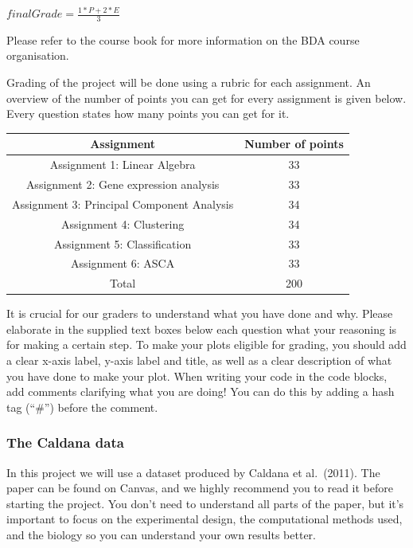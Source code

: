 \documentclass[
]{article}
\begin{document}
\(finalGrade = \frac{1*P+2*E}{3}\)

Please refer to the course book for more information on the BDA course
organisation.

Grading of the project will be done using a rubric for each assignment.
An overview of the number of points you can get for every assignment is
given below. Every question states how many points you can get for it.

\begin{longtable}[]{@{}cc@{}}
\toprule()
Assignment & Number of points \\
\midrule()
\endhead
Assignment 1: Linear Algebra & 33 \\
Assignment 2: Gene expression analysis & 33 \\
Assignment 3: Principal Component Analysis & 34 \\
Assignment 4: Clustering & 34 \\
Assignment 5: Classification & 33 \\
Assignment 6: ASCA & 33 \\
Total & 200 \\
\bottomrule()
\end{longtable}

It is crucial for our graders to understand what you have done and why.
Please elaborate in the supplied text boxes below each question what
your reasoning is for making a certain step. To make your plots eligible
for grading, you should add a clear x-axis label, y-axis label and
title, as well as a clear description of what you have done to make your
plot. When writing your code in the code blocks, add comments clarifying
what you are doing! You can do this by adding a hash tag (``\#'') before
the comment.

\hypertarget{the-caldana-data}{%
\subsubsection{The Caldana data}\label{the-caldana-data}}

In this project we will use a dataset produced by Caldana et al.~(2011).
The paper can be found on Canvas, and we highly recommend you to read it
before starting the project. You don't need to understand all parts of
the paper, but it's important to focus on the experimental design, the
computational methods used, and the biology so you can understand your
own results better.
\end{document}
